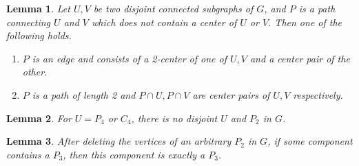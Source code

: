 \documentclass[10pt,a4paper]{amsart}
\newtheorem{lem}{Lemma}
\begin{document}
\begin{lem}\label{conpath}
    Let $U,V$ be two disjoint connected subgraphs of $G$, and $P$ is a path connecting $U$ and $V$ which does not contain a center of $U$ or $V$. Then one of the following holds.
    \begin{enumerate}
    \item $P$ is an edge and consists of a 2-center of one of $U,V$ and a center pair of the other.
    \item $P$ is a path of length 2 and $P\cap U, P\cap V$ are center pairs of $U,V$ respectively.
    \end{enumerate}
\end{lem}

\begin{lem}\label{4P2}
	For $U=P_4$ or $C_4$, there is no disjoint $U$ and $P_2$ in $G$.
\end{lem}

\begin{lem}\label{I3P2}
	After deleting the vertices of an arbitrary $P_2$ in $G$, if some component contains a $P_3$, then this component is exactly a $P_3$. 
\end{lem}
\end{document}
